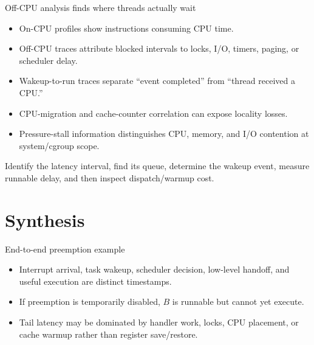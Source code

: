 \documentclass[aspectratio=169,11pt]{beamer}
\begin{document}
\begin{frame}{Off-CPU analysis finds where threads actually wait}
  \begin{itemize}
    \item On-CPU profiles show instructions consuming CPU time.
    \item Off-CPU traces attribute blocked intervals to locks, I/O, timers, paging, or scheduler delay.
    \item Wakeup-to-run traces separate ``event completed'' from ``thread received a CPU.''
    \item CPU-migration and cache-counter correlation can expose locality losses.
    \item Pressure-stall information distinguishes CPU, memory, and I/O contention at system/cgroup scope.
  \end{itemize}
  \begin{tcolorbox}[title=Diagnostic sequence]
    Identify the latency interval, find its queue, determine the wakeup event, measure runnable delay, and then inspect dispatch/warmup cost.
  \end{tcolorbox}
\end{frame}

\section{Synthesis}

\begin{frame}{End-to-end preemption example}
  \centering
  \begin{itemize}
    \item Interrupt arrival, task wakeup, scheduler decision, low-level handoff, and useful execution are distinct timestamps.
    \item If preemption is temporarily disabled, $B$ is runnable but cannot yet execute.
    \item Tail latency may be dominated by handler work, locks, CPU placement, or cache warmup rather than register save/restore.
  \end{itemize}
\end{frame}
\end{document}
